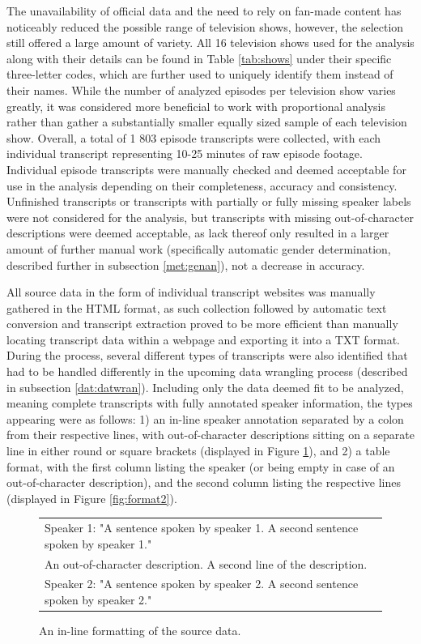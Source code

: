 \documentclass[a4paper, 11pt]{article}
\begin{document}
The unavailability of official data and the need to rely on fan-made content has noticeably reduced the possible range of television shows, however, the selection still offered a large amount of variety. All 16 television shows used for the analysis along with their details can be found in Table \ref{tab:shows} under their specific three-letter codes, which are further used to uniquely identify them instead of their names. While the number of analyzed episodes per television show varies greatly, it was considered more beneficial to work with proportional analysis rather than gather a substantially smaller equally sized sample of each television show. Overall, a total of 1 803 episode transcripts were collected, with each individual transcript representing 10-25 minutes of raw episode footage. Individual episode transcripts were manually checked and deemed acceptable for use in the analysis depending on their completeness, accuracy and consistency. Unfinished transcripts or transcripts with partially or fully missing speaker labels were not considered for the analysis, but transcripts with missing out-of-character descriptions were deemed acceptable, as lack thereof only resulted in a larger amount of further manual work (specifically automatic gender determination, described further in subsection \ref{met:genan}), not a decrease in accuracy.

All source data in the form of individual transcript websites was manually gathered in the HTML format, as such collection followed by automatic text conversion and transcript extraction proved to be more efficient than manually locating transcript data within a webpage and exporting it into a TXT format. During the process, several different types of transcripts were also identified that had to be handled differently in the upcoming data wrangling process (described in subsection \ref{dat:datwran}). Including only the data deemed fit to be analyzed, meaning complete transcripts with fully annotated speaker information, the types appearing were as follows: 1) an in-line speaker annotation separated by a colon from their respective lines, with out-of-character descriptions sitting on a separate line in either round or square brackets (displayed in Figure \ref{fig:format1}), and 2) a table format, with the first column listing the speaker (or being empty in case of an out-of-character description), and the second column listing the respective lines (displayed in Figure \ref{fig:format2}).

\begin{figure}[h!]
  \centering
  \begin{small}
  \begin{tabular}{l}
  Speaker 1: "A sentence spoken by speaker 1. A second sentence spoken by speaker 1." \\
  An out-of-character description. A second line of the description. \\
  Speaker 2: "A sentence spoken by speaker 2. A second sentence spoken by speaker 2." \\
  \end{tabular}
  \end{small}
  \caption{An in-line formatting of the source data.}
  \label{fig:format1}
\end{figure}
\end{document}
